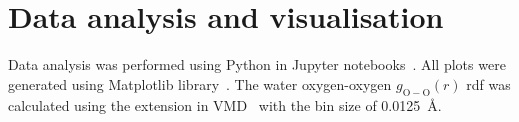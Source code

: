 
\section{Data analysis and visualisation}
Data analysis was performed using Python in Jupyter notebooks~\citep{grangerJupyterThinkingStorytelling2021}. All plots were generated using Matplotlib library~\citep{hunterMatplotlib2DGraphics2007}. The water oxygen-oxygen $g_\mathrm{O-O}(r)$ \ac{rdf} was calculated using the extension in VMD~\citep{humphreyVMDVisualMolecular1996} with the bin size of 0.0125~\AA.
